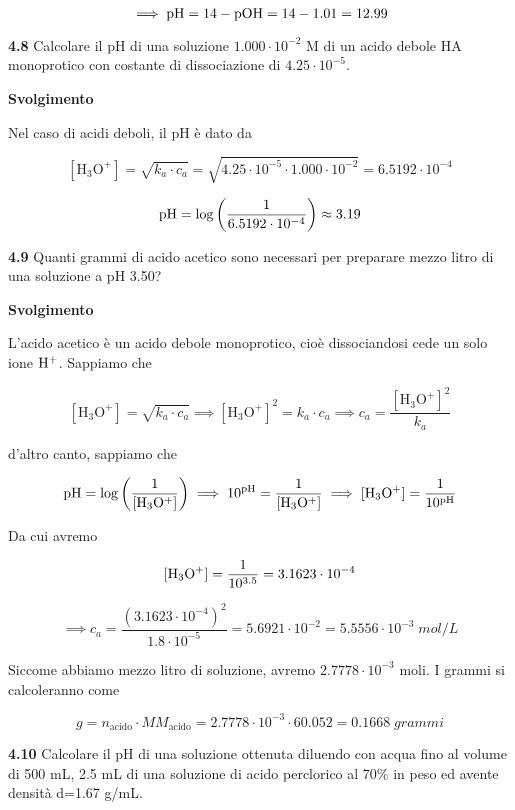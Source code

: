 $$\implies \rm pH=14-pOH=14-1.01=12.99$$

\vspace{0.2cm}\textbf{4.8} Calcolare il pH di una soluzione $1.000 \cdot 10^{-2}$ M di un acido debole HA monoprotico con costante di dissociazione di $4.25 \cdot  10^{-5}$.

\vspace{0.2cm}\large\textbf{Svolgimento}\normalsize

\vspace{0.2cm}Nel caso di acidi deboli, il pH è dato da

$$[\text{H}_3\text{O}^+] = \sqrt{k_a \cdot c_a}
=\sqrt{4.25 \cdot  10^{-5} \cdot 1.000 \cdot 10^{-2}}=6.5192 \cdot 10^{-4}$$

$$\rm pH=\log{\left(\frac{1}{6.5192 \cdot 10^{-4}}\right)}\approx 3.19$$

\vspace{0.2cm}\textbf{4.9} Quanti grammi di acido acetico sono necessari per preparare mezzo litro di una soluzione a pH 3.50?

\vspace{0.2cm}\large\textbf{Svolgimento}\normalsize

\vspace{0.2cm}L'acido acetico è un acido debole monoprotico, cioè dissociandosi cede un solo ione $\rm H^+$. Sappiamo che

$$[\text{H}_3\text{O}^+] = \sqrt{k_a \cdot c_a}
\implies
[\text{H}_3\text{O}^+]^2 = k_a \cdot c_a
\implies
c_a=\frac{[\text{H}_3\text{O}^+]^2}{k_a}$$

d'altro canto, sappiamo che

$$\rm pH=\log{\left(\frac{1}{[H_3O^+]}\right)}
\implies
10^{pH}=\frac{1}{[H_3O^+]}
\implies
[H_3O^+]=\frac{1}{10^{pH}}$$

Da cui avremo

$$\rm [H_3O^+]=\frac{1}{10^{3.5}}=3.1623 \cdot 10^{-4}$$

$$\implies
c_a=\frac{(3.1623 \cdot 10^{-4})^2}{1.8 \cdot 10^{-5}}=5.6921 \cdot 10^{-2}
=5.5556 \cdot 10^{-3}\;mol/L$$

Siccome abbiamo mezzo litro di soluzione, avremo $2.7778 \cdot 10^{-3}$ moli. I grammi si calcoleranno come

$$g=n_{\text{acido}} \cdot MM_{\text{acido}}
=2.7778 \cdot 10^{-3} \cdot 60.052=0.1668\;grammi$$

\vspace{0.2cm}\textbf{4.10} Calcolare il pH di una soluzione ottenuta diluendo con acqua fino al volume di 500 mL, 2.5 mL
di una soluzione di acido perclorico al 70\% in peso ed avente densità d=1.67 g/mL.

